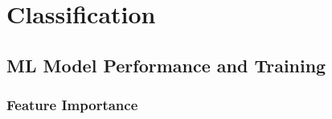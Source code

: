 \section{Classification} \label{sec:res_ModelPerformance}





\subsection{ML Model Performance and Training}

\subsubsection{Feature Importance}

